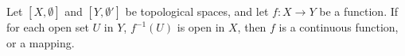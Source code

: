 Let $[X, \emptyset]$ and $[Y, \emptyset']$ be topological spaces, and let $f: X \rightarrow Y$ be a function. If for each open set $U$ in $Y$, $f^{-1}(U)$ is open in $X$, then $f$ is a continuous function, or a mapping.
